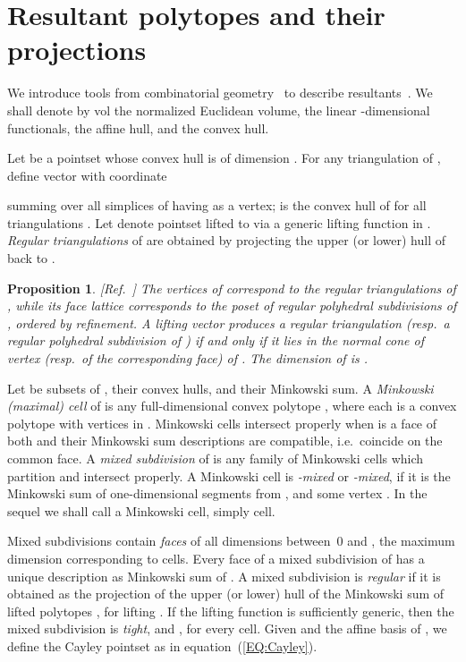 \documentclass{article}
\newtheorem{proposition}{Proposition}
\newcommand\refcite[1]{\citealp{#1}} \newcommand\citess[1]{\textsuperscript{\textup{\citealp{#1}}}}
\begin{document}
\section{Resultant polytopes and their projections}\label{Scombinatorics}

We introduce tools from combinatorial geometry~\citess{DeLRamSan,Ziegler}
to describe resultants~\citess{GKZ,CLO2}. 
We shall denote by vol  the normalized Euclidean volume,
 the linear -dimensional functionals,  the affine hull, and 
 the convex hull. 

Let  be a pointset whose convex hull is of dimension . 
For any triangulation  of , define vector 
with coordinate

summing over all simplices  of  having  as a vertex; 
is the convex hull of  for all triangulations .
Let   denote pointset  lifted to 
via a generic lifting function  in .
{\em Regular triangulations} of  are obtained
by projecting the upper (or lower) hull of  
back to .
\begin{proposition}{\rm [Ref.~\refcite{GKZ}]}
The vertices of  correspond to the regular triangulations of ,
while its face lattice corresponds to the poset 
of regular polyhedral subdivisions of , ordered by refinement. 
A lifting vector produces a regular triangulation 
(resp.\ a regular polyhedral subdivision of )
if and only if it lies in the normal cone of vertex 
(resp.\ of the corresponding face) of .  
The dimension of  is . 
\end{proposition}
Let  be subsets of ,
 their convex hulls, and 
 their Minkowski sum.
A \emph{Minkowski (maximal) cell} of  is any full-dimensional convex
polytope , where each  is a convex polytope
with vertices in .
Minkowski cells 
intersect properly when  is a face of both and their
Minkowski sum descriptions are compatible, i.e.\ coincide on the common face.
A \textit{mixed subdivision} of  is any family of
Minkowski cells which partition  and intersect properly.
A Minkowski cell is \textit{-mixed} or \textit{-mixed},
if it is the Minkowski sum of  one-dimensional segments from
, and some vertex . In the sequel we shall call
a Minkowski cell, simply cell.

Mixed subdivisions contain {\em faces} of all dimensions between~0 and ,
the maximum dimension corresponding to cells.
Every face of a mixed subdivision of  has a unique description as
Minkowski sum of .
A mixed subdivision is {\em regular} if it is obtained as the projection
of the upper (or lower) hull of the Minkowski sum of lifted polytopes
, for lifting
.
If the lifting function  is sufficiently generic,
then the mixed subdivision is \emph{tight}, and
, for every cell.
Given  and the affine basis  of ,
we define the Cayley pointset  as in
equation~(\ref{EQ:Cayley}).
\end{document}
